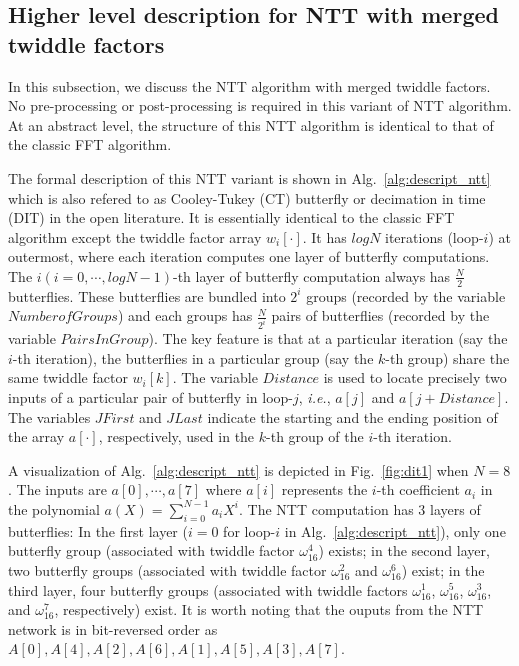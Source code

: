 \documentclass{iacrtrans}
\theoremstyle{plain}
\begin{document}
\subsection{Higher level description for NTT with merged twiddle factors}\label{sec:gf2m_arith}

In this subsection, we discuss the NTT algorithm with merged twiddle factors. No pre-processing or post-processing is required in this variant of NTT algorithm. At an abstract level, the structure of this NTT algorithm is identical to that of the classic FFT algorithm. 


The formal description of this NTT variant is shown in Alg.~\ref{alg:descript_ntt} which is also refered to as Cooley-Tukey (CT) butterfly or decimation in time (DIT) in the open literature. It is essentially identical to the classic FFT algorithm except the twiddle factor array $w_i[\cdot]$. It has $logN$ iterations (loop-$i$) at outermost, where each iteration computes one layer of butterfly computations.  The $i(i=0,\cdots,logN-1)$-th layer of butterfly computation always has $\frac{N}{2}$ butterflies. These butterflies are bundled into $2^i$ groups (recorded by the variable $NumberofGroups$) and each groups has $\frac{N}{2^i}$ pairs of butterflies (recorded by the variable $PairsInGroup$). The key feature is that at a particular iteration (say the $i$-th iteration), the butterflies in a particular group (say the $k$-th group) share the same twiddle factor $w_i[k]$. The variable $Distance$ is used to locate precisely two inputs of a particular pair of butterfly in loop-$j$, \textit{i.e.}, $a[j]$ and $a[j+Distance]$. The variables $JFirst$ and $JLast$ indicate the starting and the ending position of the array $a[\cdot]$, respectively, used in the $k$-th group of the $i$-th iteration.

A visualization of Alg.~\ref{alg:descript_ntt} is depicted in Fig.~\ref{fig:dit1} when $N=8$. The inputs are $a[0],\cdots,a[7]$ where $a[i]$ represents the $i$-th coefficient $a_i$ in the polynomial $a(X)=\sum_{i=0}^{N-1}a_iX^i$. The NTT computation has 3 layers of butterflies: In the first layer ($i=0$ for loop-$i$ in Alg.~\ref{alg:descript_ntt}), only one butterfly group (associated with twiddle factor $\omega_{16}^4$) exists; in the second layer, two butterfly groups (associated with twiddle factor $\omega_{16}^2$ and $\omega_{16}^6$) exist; in the third layer, four butterfly groups (associated with twiddle factors $\omega_{16}^1$, $\omega_{16}^5$, $\omega_{16}^3$, and $\omega_{16}^7$, respectively) exist. It is worth noting that the ouputs from the NTT network is in bit-reversed order as $A[0],A[4],A[2],A[6],A[1],A[5],A[3],A[7]$.
\end{document}
